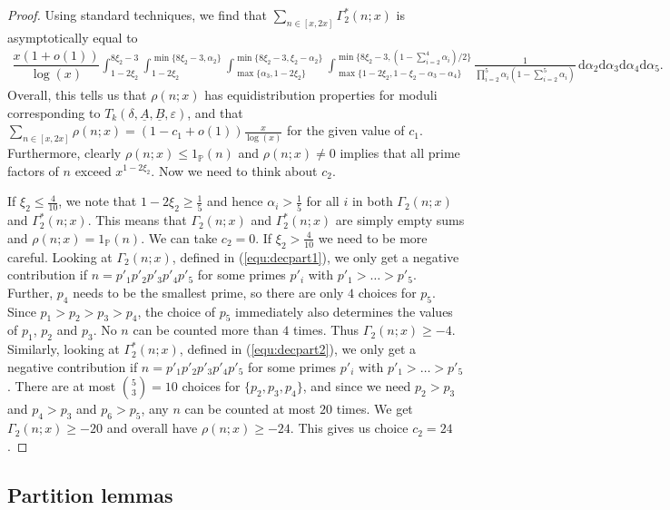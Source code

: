 \documentclass{amsart}
\numberwithin{equation}{section}
\begin{document}
\begin{proof}
Using standard techniques, we find that $\sum_{ n \in[x,2x]}\Gamma^*_2(n;x)$ is asymptotically equal to 
\begin{align*} 
\dfrac{x (1+o(1))}{\log(x)}\!\! \int^{8\xi_2-3 }_{1 -2\xi_2}\int^{\min\{8\xi_2-3 , \alpha_2\}}_{1 -2\xi_2}\!\!\!\!\int_{\max\{\alpha_3, 1 -2\xi_2\}}^{\min\{8\xi_2-3 , \xi_2-\alpha_2\}}\!\!\!\!\int^{\min\{8\xi_2-3 ,(1-\sum_{i=2}^4\alpha_i)/2\}}_{\max\{1 -2\xi_2,1 - \xi_2-\alpha_3-\alpha_4\}} \frac{1}{\prod_{i=2}^5\alpha_i(1-\sum_{i=2}^5\alpha_i)} \, \mbox{d}\alpha_2 \mbox{d}\alpha_3\mbox{d}\alpha_4\mbox{d}\alpha_5.
\end{align*} 
Overall, this tells us that $\rho(n;x)$ has  equidistribution properties for  moduli corresponding to $T_k(\delta,\underline{A},\underline{B},\varepsilon)$, and that $\sum_{n \in [x,2x]} \rho(n;x) = (1-c_1 +o(1)) \frac{x}{\log(x)}$ for the given value of $c_1$. Furthermore, clearly $\rho(n;x) \leq 1_{\mathbb{P}}(n)$ and  $\rho(n;x) \neq 0$   implies that all prime factors of $n$ exceed $x^{1-2\xi_2}$.  Now we   need to think about $c_2$. 

\medskip If $\xi_2 \leq \frac{4}{10}$, we note that $1-2\xi_2 \geq \frac{1}{5}$ and hence  $\alpha_i > \frac{1}{5}$ for all $i$ in both $\Gamma_2(n;x)$ and $\Gamma^*_2(n;x)$. This means that $\Gamma_2(n;x)$ and $\Gamma^*_2(n;x)$ are simply empty sums and $\rho(n;x)=1_{\mathbb{P}}(n)$. We can take $c_2=0$. If $\xi_2 >\frac{4}{10}$ we need to be more careful. Looking at  $\Gamma_2(n;x)$, defined in (\ref{equ:decpart1}), we only get a negative contribution if $n=p'_1p'_2p'_3p'_4p'_5$ for some primes $p'_i$ with $p'_1 > \dots > p'_5$. Further, $p_4$ needs to be the smallest prime, so there are only $4$ choices for $p_5$. Since $p_1 > p_2 > p_3 > p_4$, the choice of $p_5$ immediately   also determines the values of $p_1$, $p_2$ and $p_3$. No $n$ can be counted more than $4$ times. Thus  $\Gamma_2(n;x) \geq -4$. Similarly, looking at $\Gamma^*_2(n;x)$, defined in (\ref{equ:decpart2}), we only get a negative contribution if  $n=p'_1p'_2p'_3p'_4p'_5$ for some primes $p'_i$ with $p'_1 > \dots > p'_5$. There are at most $\binom{5}{3}=10$ choices for $\{p_2,p_3, p_4\}$, and since we need $p_2>p_3$ and $p_4 > p_3$ and $p_6>p_5$, any $n$ can be counted at most $20$ times. We get $\Gamma_2(n;x) \geq -20$ and overall have $\rho(n;x) \geq -24$. This gives us choice $c_2=24$.
\end{proof}
 
 

\subsection{Partition lemmas}
\end{document}
